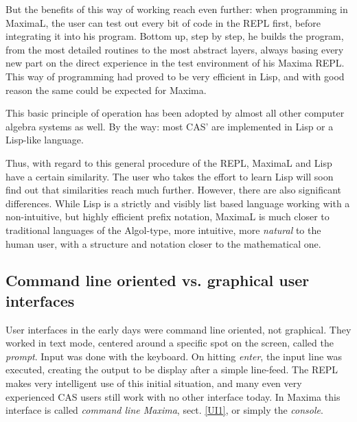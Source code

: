 \documentclass[../Maxima_Workbook.tex]{subfiles}
\begin{document}
\lz But the benefits of this way of working reach even further: when programming in MaximaL, the user can test out every bit of code in the REPL first, before integrating it into his program. Bottom up, step by step, he builds the program, from the most detailed routines to the most abstract layers, always basing every new part on the direct experience in the test environment of his Maxima REPL. This way of programming had proved to be very efficient in Lisp, and with good reason the same could be expected for Maxima.

\lz This basic principle of operation has been adopted by almost all other computer algebra systems as well. By the way: most CAS' are implemented in Lisp or a Lisp-like language.

\lz Thus, with regard to this general procedure of the REPL, MaximaL and Lisp have a certain similarity. The user who takes the effort to learn Lisp will soon find out that similarities reach much further. However, there are also significant differences. While Lisp is a strictly and visibly list based language working with a non-intuitive, but highly efficient prefix notation, MaximaL is much closer to traditional languages of the Algol-type, more intuitive, more \emph{natural} to the human user, with a structure and notation closer to the mathematical one.

\subsection{Command line oriented vs. graphical user interfaces}

User interfaces in the early days were command line oriented, not graphical. They worked in text mode, centered around a specific spot on the screen, called the \emph{prompt}. Input was done with the keyboard. On hitting \emph{enter}, the input line was executed, creating the output to be display after a simple line-feed. The REPL makes very intelligent use of this initial situation, and many even very experienced CAS users still work with no other interface today. In Maxima this interface is called \emph{command line Maxima}, sect. \ref{UI1}, or simply the \emph{console}.
\end{document}
